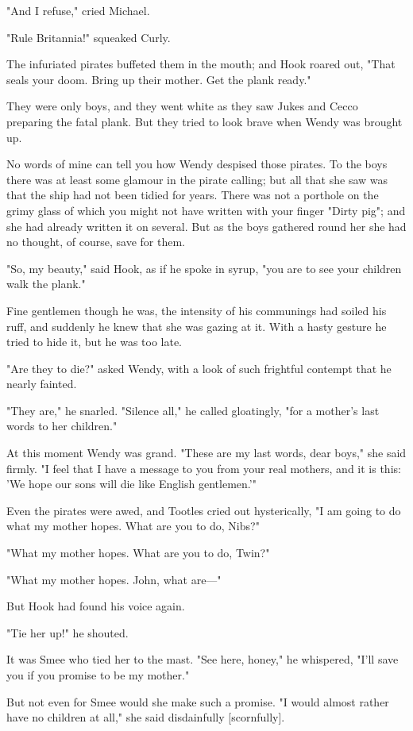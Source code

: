 "And I refuse," cried Michael.


"Rule Britannia!" squeaked Curly.


The infuriated pirates buffeted them in the mouth; and Hook roared out,
"That seals your doom. Bring up their mother. Get the plank ready."


They were only boys, and they went white as they saw Jukes and Cecco
preparing the fatal plank. But they tried to look brave when Wendy was
brought up.


No words of mine can tell you how Wendy despised those pirates. To the
boys there was at least some glamour in the pirate calling; but all that
she saw was that the ship had not been tidied for years. There was not a
porthole on the grimy glass of which you might not have written with your
finger "Dirty pig"; and she had already written it on several. But as the
boys gathered round her she had no thought, of course, save for them.


"So, my beauty," said Hook, as if he spoke in syrup, "you are to see your
children walk the plank."


Fine gentlemen though he was, the intensity of his communings had soiled
his ruff, and suddenly he knew that she was gazing at it. With a hasty
gesture he tried to hide it, but he was too late.


"Are they to die?" asked Wendy, with a look of such frightful contempt
that he nearly fainted.


"They are," he snarled. "Silence all," he called gloatingly, "for a
mother's last words to her children."


At this moment Wendy was grand. "These are my last words, dear boys," she
said firmly. "I feel that I have a message to you from your real mothers,
and it is this: 'We hope our sons will die like English gentlemen.'"


Even the pirates were awed, and Tootles cried out hysterically, "I am
going to do what my mother hopes. What are you to do, Nibs?"


"What my mother hopes. What are you to do, Twin?"


"What my mother hopes. John, what are—"


But Hook had found his voice again.


"Tie her up!" he shouted.


It was Smee who tied her to the mast. "See here, honey," he whispered,
"I'll save you if you promise to be my mother."


But not even for Smee would she make such a promise. "I would almost
rather have no children at all," she said disdainfully [scornfully].



